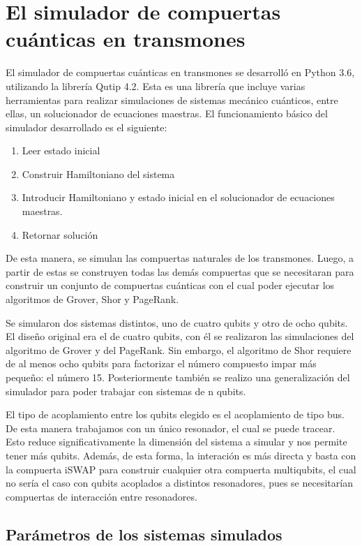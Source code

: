 \chapter{El simulador de compuertas cuánticas en transmones}
\label{ch:simulador}

El simulador de compuertas cuánticas en transmones se desarrolló en Python 3.6, utilizando la librería Qutip 4.2. Esta es una librería que incluye varias herramientas para realizar simulaciones de sistemas mecánico cuánticos, entre ellas, un solucionador de ecuaciones maestras. El funcionamiento básico del simulador desarrollado es el siguiente:

\begin{enumerate}
    \item Leer estado inicial
    \item Construir Hamiltoniano del sistema
    \item Introducir Hamiltoniano y estado inicial en el solucionador de ecuaciones maestras.
    \item Retornar solución
\end{enumerate}

De esta manera, se simulan las compuertas naturales de los transmones. Luego, a partir de estas se construyen todas las demás compuertas que se necesitaran para construir un conjunto de compuertas cuánticas con el cual poder ejecutar los algoritmos de Grover, Shor y PageRank.

Se simularon dos sistemas distintos, uno de cuatro qubits y otro de ocho qubits. El diseño original era el de cuatro qubits, con él se realizaron las simulaciones del algoritmo de Grover y del PageRank. Sin embargo, el algoritmo de Shor requiere de al menos ocho qubits para factorizar el número compuesto impar más pequeño: el número 15. Posteriormente también se realizo una generalización del simulador para poder trabajar con sistemas de n qubits.

El tipo de acoplamiento entre los qubits elegido es el acoplamiento de tipo bus. De esta manera trabajamos con un único resonador, el cual se puede tracear. Esto reduce significativamente la dimensión del sistema a simular y nos permite tener más qubits. Además, de esta forma, la interación es más directa y basta con la compuerta iSWAP para construir cualquier otra compuerta multiqubits, el cual no sería el caso con qubits acoplados a distintos resonadores, pues se necesitarían compuertas de interacción entre resonadores.

\section{Parámetros de los sistemas simulados}

